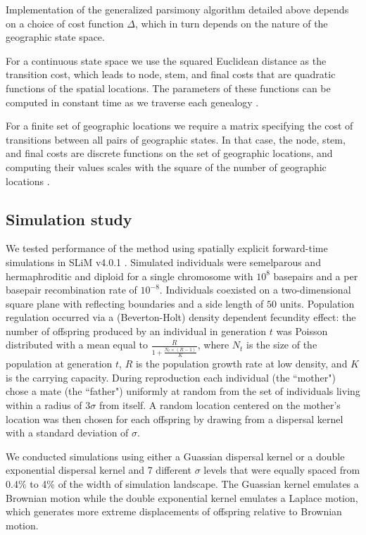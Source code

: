 Implementation of the generalized parsimony algorithm detailed above depends on
a choice of cost function $\Delta$, which in turn depends on the nature of the
geographic state space.

For a continuous state space we use the squared Euclidean distance as the 
transition cost, which leads to node, stem, and final costs that are quadratic 
functions of the spatial locations. The parameters of these functions can be 
computed in constant time as we traverse each genealogy \citep{Maddison_1991}.

For a finite set of geographic locations we require a matrix specifying the 
cost of transitions between all pairs of geographic states. In that case, the
node, stem, and final costs are discrete functions on the set of geographic
locations, and computing their values scales with the square of the number of
geographic locations \citep{Clemente_etal_2009}.

\subsection{Simulation study}

We tested performance of the method using spatially explicit forward-time 
simulations in SLiM v4.0.1 \citep{Haller_Messer_2023}. Simulated individuals
were semelparous and hermaphroditic and diploid for a single chromosome with 
$10^8$ basepairs and a per basepair recombination rate of $10^{-8}$. Individuals
coexisted on a two-dimensional square plane with reflecting boundaries and a 
side length of $50$ units. Population regulation occurred via a (Beverton-Holt) 
density dependent fecundity effect: the number of offspring produced by an 
individual in generation $t$ was Poisson distributed with a mean equal to 
$\frac{R}{1 + \frac{N_t \times (R-1)}{K}}$, where $N_t$ is the size of the 
population at generation $t$, $R$ is the population growth rate at low density, 
and $K$ is the carrying capacity. During reproduction each individual 
(the ``mother") chose a mate (the ``father") uniformly at random from the set 
of individuals living within a radius of $3\sigma$ from itself. A random 
location centered on the mother's location was then chosen for each offspring 
by drawing from a dispersal kernel with a standard deviation of $\sigma$.

We conducted simulations using either a Guassian dispersal kernel or a double
exponential dispersal kernel and 7 different $\sigma$ levels that were equally
spaced from 0.4\% to 4\% of the width of simulation landscape. The Guassian
kernel emulates a Brownian motion while the double exponential kernel emulates
a Laplace motion, which generates more extreme displacements of offspring
relative to Brownian motion.

